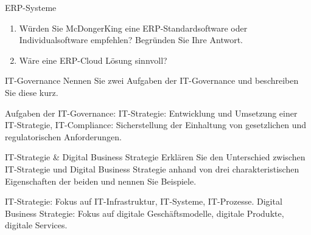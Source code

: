\documentclass{article}
\begin{document}
\begin{exercise}{ERP-Systeme}
  \begin{enumerate}
    \item Würden Sie McDongerKing eine ERP-Standardsoftware oder Individualsoftware empfehlen? Begründen Sie Ihre Antwort.
    \item Wäre eine ERP-Cloud Lösung sinnvoll?
  \end{enumerate}

  \begin{solution}
  \end{solution}
\end{exercise}

\begin{exercise}{IT-Governance}
  Nennen Sie zwei Aufgaben der IT-Governance und beschreiben Sie diese kurz.

  \begin{solution}
    Aufgaben der IT-Governance: IT-Strategie: Entwicklung und Umsetzung einer IT-Strategie, IT-Compliance: Sicherstellung der Einhaltung von gesetzlichen und regulatorischen Anforderungen.
  \end{solution}
\end{exercise}

\begin{exercise}{IT-Strategie \& Digital Business Strategie}
  Erklären Sie den Unterschied zwischen IT-Strategie und Digital Business Strategie anhand von drei charakteristischen Eigenschaften der beiden und nennen Sie Beispiele.

  \begin{solution}
    IT-Strategie: Fokus auf IT-Infrastruktur, IT-Systeme, IT-Prozesse. Digital Business Strategie: Fokus auf digitale Geschäftsmodelle, digitale Produkte, digitale Services.
  \end{solution}
\end{exercise}
\end{document}

